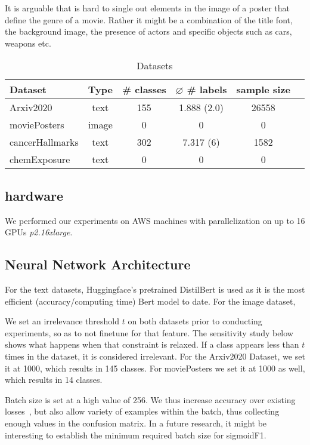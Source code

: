 It is arguable that is hard to single out elements in the image of a poster that define the genre of a movie. Rather it might be a combination of the title font, the background image, the presence of actors and specific objects such as cars, weapons etc.

\begin{table}
\caption{Datasets}
\label{tab:arxiv2020}
\centering
\begin{tabular}{l ccccc}
\toprule
Dataset & Type & \# classes & $\varnothing$ \# labels & sample size\\
\midrule
Arxiv2020 & text & 155 & 1.888 (2.0) & 26558\\ 
moviePosters & image & 0 & 0 & 0\\
cancerHallmarks & text & 302 & 7.317 (6) & 1582\\
chemExposure & text & 0 & 0 & 0\\
\bottomrule
\end{tabular}
\end{table}


\subsection{hardware}

We performed our experiments on AWS machines with parallelization on up to 16 GPUs \textit{p2.16xlarge}.

\subsection{Neural Network Architecture}

For the text datasets, Huggingface's pretrained DistilBert is used as it is the most efficient (accuracy/computing time) Bert model to date. For the image dataset, 

We set an irrelevance threshold $t$ on both datasets prior to conducting experiments, so as to not finetune for that feature. The sensitivity study below shows what happens when that constraint is relaxed. If a class appears less than $t$ times in the dataset, it is considered irrelevant. For the Arxiv2020 Dataset, we set it at 1000, which results in 145 classes. For moviePosters we set it at 1000 as well, which results in 14 classes.

Batch size is set at a high value of 256. We thus increase accuracy over existing losses~\cite{bigBS}, but also allow variety of examples within the batch, thus collecting enough values in the confusion matrix. In a future research, it might be interesting to establish the minimum required batch size for sigmoidF1.

